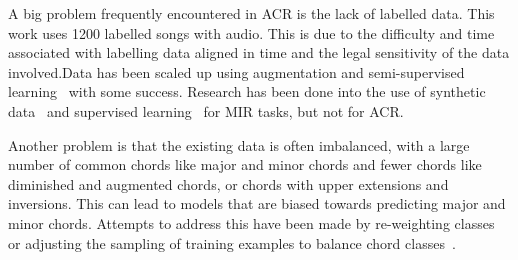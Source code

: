 A big problem frequently encountered in ACR is the lack of labelled data. This work uses 1200 labelled songs with audio. This is due to the difficulty and time associated with labelling data aligned in time and the legal sensitivity of the data involved.Data has been scaled up using augmentation and semi-supervised learning~\citep{ScalingUpSemiSupervisedLearning} with some success. Research has been done into the use of synthetic data~\citep{MusicGenTrainingData,AnnotationFreeSyntheticData} and supervised learning~\citep{MERTSupervisedLearning} for MIR tasks, but not for ACR.

Another problem is that the existing data is often imbalanced, with a large number of common chords like major and minor chords and fewer chords like diminished and augmented chords, or chords with upper extensions and inversions. This can lead to models that are biased towards predicting major and minor chords. Attempts to address this have been made by re-weighting classes~\citep{ACRLargeVocab1} or adjusting the sampling of training examples to balance chord classes~\citep{BalanceRandomForestACR}.
